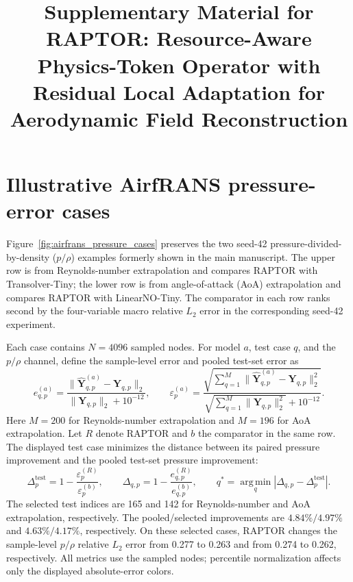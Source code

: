\documentclass[11pt,a4paper]{article}
\title{Supplementary Material for\\
RAPTOR: Resource-Aware Physics-Token Operator with Residual Local Adaptation
for Aerodynamic Field Reconstruction}
\author{}
\date{}
\begin{document}
\maketitle
\vspace{-2em}

\section*{Illustrative AirfRANS pressure-error cases}

Figure~\ref{fig:airfrans_pressure_cases} preserves the two seed-42
pressure-divided-by-density (\(p/\rho\)) examples formerly shown in the main
manuscript. The upper row is from Reynolds-number extrapolation and compares
RAPTOR with Transolver-Tiny; the lower row is from angle-of-attack (AoA)
extrapolation and compares RAPTOR with LinearNO-Tiny. The comparator in each
row ranks second by the four-variable macro relative \(L_2\) error in the
corresponding seed-42 experiment.

Each case contains \(N=4096\) sampled nodes. For model \(a\), test case
\(q\), and the \(p/\rho\) channel, define the sample-level error and pooled
test-set error as
\begin{equation}
e_{q,p}^{(a)}
=
\frac{\|\widehat{\mathbf Y}_{q,p}^{(a)}-\mathbf Y_{q,p}\|_2}
{\|\mathbf Y_{q,p}\|_2+10^{-12}},
\qquad
\varepsilon_p^{(a)}
=
\frac{\sqrt{\sum_{q=1}^{M}
\|\widehat{\mathbf Y}_{q,p}^{(a)}-\mathbf Y_{q,p}\|_2^2}}
{\sqrt{\sum_{q=1}^{M}\|\mathbf Y_{q,p}\|_2^2}+10^{-12}}.
\label{eq:supp_pressure_errors}
\end{equation}
Here \(M=200\) for Reynolds-number extrapolation and \(M=196\) for AoA
extrapolation. Let \(R\) denote RAPTOR and \(b\) the comparator in the same
row. The displayed test case minimizes the distance between its paired
pressure improvement and the pooled test-set pressure improvement:
\begin{equation}
\Delta_p^{\mathrm{test}}
=1-\frac{\varepsilon_p^{(R)}}{\varepsilon_p^{(b)}},
\qquad
\Delta_{q,p}
=1-\frac{e_{q,p}^{(R)}}{e_{q,p}^{(b)}},
\qquad
q^*=\operatorname*{arg\,min}_{q}
\left|\Delta_{q,p}-\Delta_p^{\mathrm{test}}\right|.
\label{eq:supp_case_selection}
\end{equation}
The selected test indices are 165 and 142 for Reynolds-number and AoA
extrapolation, respectively. The pooled/selected improvements are
\(4.84\%/4.97\%\) and \(4.63\%/4.17\%\), respectively. On these selected
cases, RAPTOR changes the sample-level \(p/\rho\) relative \(L_2\) error
from 0.277 to 0.263 and from 0.274 to 0.262, respectively. All metrics
use the sampled nodes; percentile normalization affects only the
displayed absolute-error colors.
\end{document}
